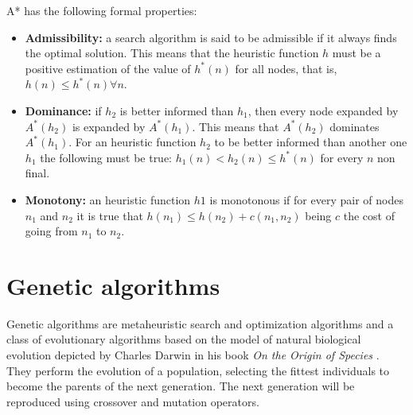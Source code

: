 \documentclass[11pt]{llncs}
\begin{document}
A* has the following formal properties:
\begin{itemize}
    \item \textbf{Admissibility:} a search algorithm is said to be admissible if it always finds the optimal solution. This means that the heuristic function $h$ must be a positive estimation of the value of $h^{*}(n)$ for all nodes, that is, $h(n) \leq h^{*}(n) \forall n$. 
    \item \textbf{Dominance:} if $h_2$ is better informed than $h_1$, then every node expanded by $A^{*}(h_2)$ is expanded by $A^{*}(h_1)$. This means that $A^{*}(h_2)$ dominates $A^{*}(h_1)$. For an heuristic function $h_2$ to be better informed than another one $h_1$ the following must be true: $h_1(n) < h_2(n) \leq h^{*}(n)$ for every $n$ non final.
    \item \textbf{Monotony:} an heuristic function $h1$ is monotonous if for every pair of nodes $n_1$ and $n_2$ it is true that $h(n_1) \leq h(n_2) + c(n_1, n_2)$ being $c$ the cost of going from $n_1$ to $n_2$.
\end{itemize}
\section{Genetic algorithms}\label{gen_algs}
Genetic algorithms \cite{ag_tutorial} are metaheuristic search and optimization algorithms and a class of evolutionary algorithms based on the model of natural biological evolution depicted by Charles Darwin in his book \textit{On the Origin of Species} \cite{darwin}. They perform the evolution of a population, selecting the fittest individuals to become the parents of the next generation. The next generation will be reproduced using crossover and mutation operators.
\end{document}
